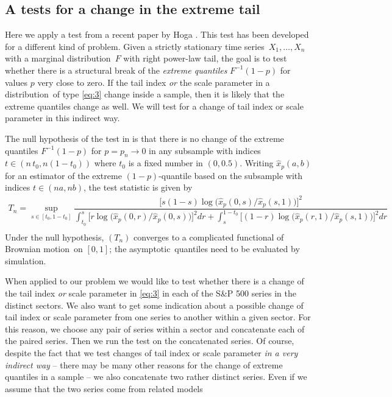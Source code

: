 \documentclass[11pt,a4]{amsart}
\newcommand{\asy}{asymptotic}
\newcommand{\ts}{time series}
\newcommand{\beam}{\begin{eqnarray}}
\newcommand{\eeam}{\end{eqnarray}\noindent}
\newcommand{\BM}{Brownian motion}
\newcommand{\fct}{function}
\newcommand{\ds}{distribution}
\newcommand{\1}{{\mathbf 1}}
\begin{document}
\subsection{A tests for a change in the extreme tail}\label{sec:Hoga}
Here we apply a test from
a recent paper by Hoga \cite{hoga:2016}. This test has been developed
for a different kind of problem. Given a strictly stationary
\ts\ $X_1,\ldots,X_n$ with a marginal \ds\ $F$ with right power-law
tail, the goal is to test whether there is a structural break of the
{\em extreme quantiles} $F^{-1}(1-p)$ for values $p$ very close to
zero. If the tail index {\em or} the scale parameter in a \ds\ of type
\eqref{eq:3} change inside a sample, then it is likely that the
extreme quantiles change as well. We will test for a change of tail
index or scale parameter in this indirect way.
\par
The null hypothesis of the test in \cite{hoga:2016} is that there is no change of the extreme quantiles $F^{-1}(1-p)$ 
for $p=p_n\to 0$ in any subsample with indices
$t\in (n\,t_0,n(1-t_0))$ where $t_0$ is a fixed number in $(0,0.5)$. Writing $\hat x_p(a,b)$ for an estimator of the extreme $(1-p)$-quantile 
based on the subsample with indices $t\in (na,nb)$, the test statistic is given by
\beam\label{eq:4}
T_n = \sup_{s \in [t_0, 1 - t_0]}
  \dfrac{  \big[s (1 - s) \log \big(\hat x_p(0, s)/\hat x_p(s, 1)\big)
    \big]^2}{
    \int_{t_0}^s\big[r \log \big( \hat x_p(0, r)/\hat x_p(0, s)
      \big)
    \big]^2 dr
    +
    \int_{s}^{1 - t_0}
    \big[
      (1 - r) \log \big(
      \hat x_p(r, 1)/
      \hat x_p(s, 1)
      \big)
    \big]^2 dr}\nonumber\\
\eeam
Under the null hypothesis, $(T_n)$ converges to a complicated \fct al of \BM\ on $[0,1]$; the \asy\ quantiles need to be 
evaluated by simulation.  
\par
When applied to our problem we would like to test 
whether there is a change of the tail index {\em or} scale parameter in \eqref{eq:3} in each of the S\&P 500 
series in the distinct sectors. We also  want to get some indication about a possible change of tail index or
scale parameter from one series to another within a given sector. For this reason, we choose any pair of series
within a sector and concatenate each of the paired series. Then we run the test on the concatenated series.
Of course, despite the fact that we test changes of tail index or scale parameter 
{\em in a very indirect way} -- there may be many other reasons for the change of extreme quantiles in a sample -- 
we also concatenate two rather distinct series. Even if we assume that the two series come from related models
\end{document}
